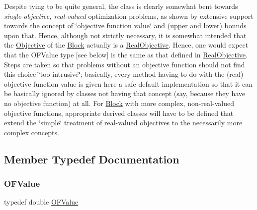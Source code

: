 Despite tying to be quite general, the class is clearly somewhat bent towards {\itshape single-\/objective, real-\/valued} optimization problems, as shown by extensive support towards the concept of \char`\"{}objective function value\char`\"{} and (upper and lower) bounds upon that. Hence, although not strictly necessary, it is somewhat intended that the \mbox{\hyperlink{class_s_m_spp__di__unipi__it_1_1_objective}{Objective}} of the \mbox{\hyperlink{class_s_m_spp__di__unipi__it_1_1_block}{Block}} actually is a \mbox{\hyperlink{class_s_m_spp__di__unipi__it_1_1_real_objective}{Real\+Objective}}. Hence, one would expect that the O\+F\+Value type \mbox{[}see below\mbox{]} is the same as that defined in \mbox{\hyperlink{class_s_m_spp__di__unipi__it_1_1_real_objective}{Real\+Objective}}. Steps are taken so that problems without an objective function should not find this choice \char`\"{}too
intrusive\char`\"{}; basically, every method having to do with the (real) objective function value is given here a safe default implementation so that it can be basically ignored by classes not having that concept (say, because they have no objective function) at all. For \mbox{\hyperlink{class_s_m_spp__di__unipi__it_1_1_block}{Block}} with more complex, non-\/real-\/valued objective functions, appropriate derived classes will have to be defined that extend the \char`\"{}simple\char`\"{} treatment of real-\/valued objectives to the necessarily more complex concepts. 

\subsection{Member Typedef Documentation}
\mbox{\label{class_s_m_spp__di__unipi__it_1_1_solver_ab8ce6bff9c21fdcd41e355167209301a}} 
\subsubsection{\texorpdfstring{O\+F\+Value}{OFValue}}
{\footnotesize\ttfamily typedef double \mbox{\hyperlink{class_s_m_spp__di__unipi__it_1_1_solver_ab8ce6bff9c21fdcd41e355167209301a}{O\+F\+Value}}}



